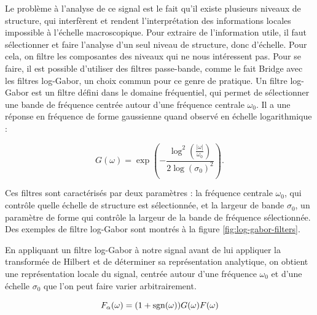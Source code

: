 Le problème à l'analyse de ce signal est le fait qu'il existe plusieurs niveaux de structure, qui interfèrent et rendent l'interprétation des informations locales impossible à l'échelle macroscopique.
Pour extraire de l'information utile, il faut sélectionner et faire l'analyse d'un seul niveau de structure, donc d'échelle.
Pour cela, on filtre les composantes des niveaux qui ne nous intéressent pas.
Pour se faire, il est possible d'utiliser des filtres passe-bande, comme le fait Bridge avec les filtres log-Gabor, un choix commun pour ce genre de pratique.
Un filtre log-Gabor est un filtre défini dans le domaine fréquentiel, qui permet de sélectionner une bande de fréquence centrée autour d'une fréquence centrale $\omega_0$.
Il a une réponse en fréquence de forme gaussienne quand observé en échelle logarithmique :

\begin{equation}
    G(\omega) = \exp\left(-\frac{\log^2(\frac{|\omega|}{\omega_0})}{2\log(\sigma_0)^2}\right).
\end{equation}

Ces filtres sont caractérisés par deux paramètres : la fréquence centrale $\omega_0$, qui contrôle quelle échelle de structure est sélectionnée, et la largeur de bande $\sigma_0$, un paramètre de forme qui contrôle la largeur de la bande de fréquence sélectionnée. Des exemples de filtre log-Gabor sont montrés à la figure \ref{fig:log-gabor-filters}.

En appliquant un filtre log-Gabor à notre signal avant de lui appliquer la transformée de Hilbert et de déterminer sa représentation analytique, on obtient une représentation locale du signal, centrée autour d'une fréquence $\omega_0$ et d'une échelle $\sigma_0$ que l'on peut faire varier arbitrairement.

\begin{equation}
    F_{\alpha}(\omega) = (1+\operatorname{sgn}(\omega))G(\omega)F(\omega)
\end{equation}


